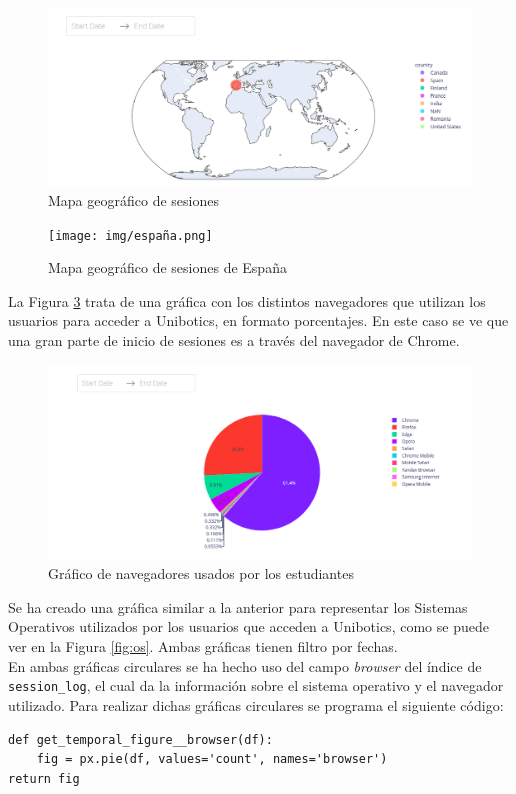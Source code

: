 \begin{figure}[H]
    \centering
    \includegraphics[width=17cm, keepaspectratio]{img/mundo.png}
    \caption{Mapa geográfico de sesiones}
    \label{fig:mundo}
\end{figure}
\begin{figure}[H]
    \centering
    \texttt{[image: img/españa.png]}
    \caption{Mapa geográfico de sesiones de España}
    \label{fig:mundo}
\end{figure}
La Figura \ref{fig:browser} trata de una gráfica con los distintos navegadores que utilizan los usuarios para acceder a Unibotics, en formato porcentajes. En este caso se ve que una gran parte de inicio de sesiones es a través del navegador de Chrome. 


\begin{figure}[H]
    \centering
    \includegraphics[width=18cm, keepaspectratio]{img/browser.png}
    \caption{Gráfico de navegadores usados por los estudiantes}
    \label{fig:browser}
\end{figure}
Se ha creado una gráfica similar a la anterior para representar los Sistemas Operativos utilizados por los usuarios que acceden a Unibotics, como se puede ver en la Figura \ref{fig:os}. Ambas gráficas tienen filtro por fechas.\\

En ambas gráficas circulares se ha hecho uso del campo \textit{browser} del índice de \newline \texttt{session\_log}, el cual da la información sobre el sistema operativo y el navegador utilizado. Para realizar dichas gráficas circulares se programa el siguiente código:
\begin{lstlisting}
def get_temporal_figure__browser(df):
    fig = px.pie(df, values='count', names='browser')
return fig
\end{lstlisting}

